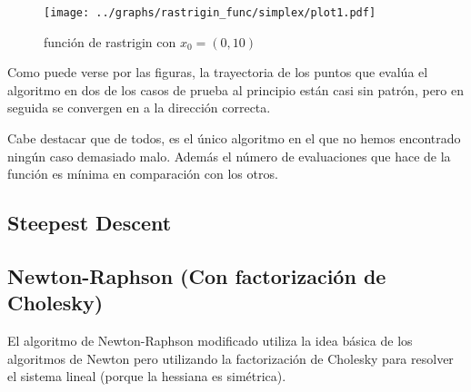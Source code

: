 \documentclass[10pt]{article}
\theoremstyle{definition}
\begin{document}
\hfill\begin{minipage}{\textwidth}
\hspace{-3ex}\begin{figure}
\vspace{-4.5em}
\texttt{[image: ../graphs/rastrigin\_func/simplex/plot1.pdf]}%
\vspace{-3.5em}
\caption{\small función de rastrigin con $x_0=(0,10)$}
\vspace{-5em}
\end{figure}
Como puede verse por las figuras, la trayectoria de los puntos que
evalúa el algoritmo en dos de los casos de prueba al principio están
casi sin patrón, pero en seguida se convergen en a la dirección
correcta.

\vspace{\baselineskip}
Cabe destacar que de todos, es el único algoritmo en el que no hemos
encontrado ningún caso demasiado malo. Además el número de
evaluaciones que hace de la función es mínima en comparación con los
otros.%
\end{minipage}\hfill\hbox{}

\vspace{-4em}
\subsection{Steepest Descent} \label{sub:alg-steepest}



\subsection{Newton-Raphson (Con factorización de Cholesky)} \label{sub:alg-newton-raphson}

El algoritmo de Newton-Raphson modificado utiliza la idea básica de los 
algoritmos de Newton pero utilizando la factorización de Cholesky para 
resolver el sistema lineal (porque la hessiana es simétrica).
\end{document}
